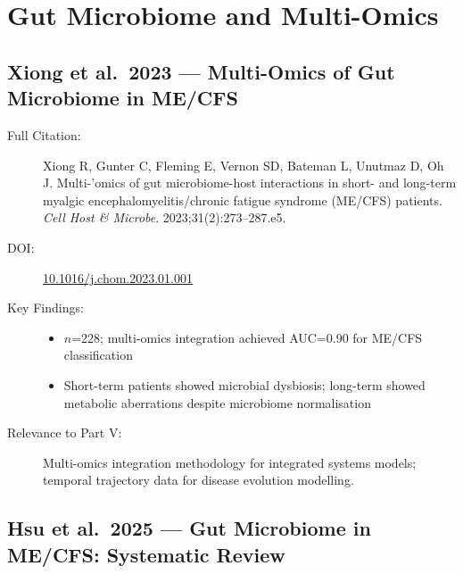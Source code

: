 \section{Gut Microbiome and Multi-Omics}
\label{sec:bib-gut-multiomics-additions}

\subsection{Xiong et al.\ 2023 --- Multi-Omics of Gut Microbiome in ME/CFS}

\begin{description}
    \item[Full Citation:] Xiong R, Gunter C, Fleming E, Vernon SD, Bateman L, Unutmaz D, Oh J. Multi-'omics of gut microbiome-host interactions in short- and long-term myalgic encephalomyelitis/chronic fatigue syndrome (ME/CFS) patients. \textit{Cell Host \& Microbe}. 2023;31(2):273--287.e5. \cite{Xiong2023multiomics}
    \item[DOI:] \href{https://doi.org/10.1016/j.chom.2023.01.001}{10.1016/j.chom.2023.01.001}
    \item[Key Findings:]
    \begin{itemize}
        \item $n$=228; multi-omics integration achieved AUC=0.90 for ME/CFS classification
        \item Short-term patients showed microbial dysbiosis; long-term showed metabolic aberrations despite microbiome normalisation
    \end{itemize}
    \item[Relevance to Part V:] Multi-omics integration methodology for integrated systems models; temporal trajectory data for disease evolution modelling.
\end{description}

\subsection{Hsu et al.\ 2025 --- Gut Microbiome in ME/CFS: Systematic Review}

